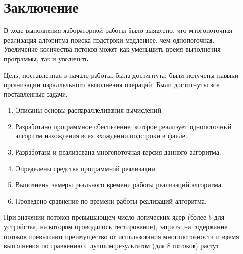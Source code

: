 \chapter*{Заключение}

В ходе выполнения лабораторной работы было выявлено, что многопоточная реализация алгоритма поиска подстроки медленнее, чем однопоточная.
Увеличение количества потоков может как уменьшить время выполнения программы, так и увеличить.

Цель, поставленная в начале работы, была достигнута: были получены навыки организации параллельного выполнения операций.
Были достигнуты все поставленные задачи.
\begin{enumerate}
	\item Описаны основы распараллеливания вычислений.
	\item Разработано программное обеспечение, которое реализует однопоточный алгоритм нахождения всех вхождений подстроки в файле.
	\item Разработана и реализована многопоточная версия данного алгоритма.
	\item Определены средства программной реализации.
	\item Выполнены замеры реального времени работы реализаций алгоритма.
	\item Проведено сравнение по времени работы реализаций алгоритма.
\end{enumerate}

При значении потоков превышающем число логических ядер (более 8 для устройства, на котором проводилось тестирование), затраты на содержание потоков превышают преимущество от использования многопоточности и время выполнения по сравнению с лучшим результатом (для 8 потоков) растут.
